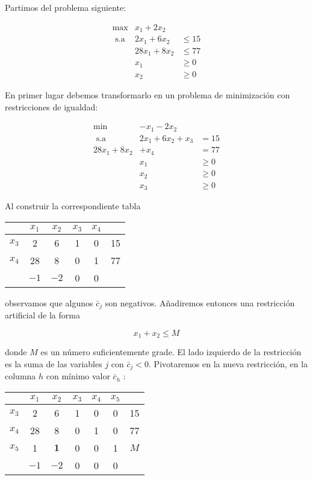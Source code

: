 \documentclass[openany]{book}
\begin{document}
\begin{example}

  Partimos del problema siguiente:

  $$
  \begin{array}{ccl}
  \max & x_{1}+2 x_{2} & \\
  \text { s.a } & 2 x_{1}+6 x_{2} & \leq 15 \\
  & 28 x_{1}+8 x_{2} & \leq 77 \\
  & x_{1} & \geq 0 \\
  &  x_{2} & \geq 0
  \end{array}
  $$

  En primer lugar debemos transformarlo en un problema de minimización con restricciones de igualdad:

  $$
  \begin{array}{lll}
  \min & -x_{1}-2 x_{2}  & \\
  \text { s.a } & 2 x_{1}+6 x_{2}+x_{3}  & =15 \\
   28 x_{1}+8 x_{2}  & +x_{4} & =77 \\
  & x_{1} &  \geq 0 \\
  & x_{2}   & \geq 0 \\
  &  x_{3}  & \geq 0
  \end{array}
  $$

  Al construir la correspondiente tabla

  \begin{tabular}{c|cccc|c}
  \hline & $x_{1}$ & $x_{2}$ & $x_{3}$ & $x_{4}$ & \\
  \hline$x_{3}$ & 2 & 6 & 1 & 0 & 15 \\
  $x_{4}$ & 28 & 8 & 0 & 1 & 77 \\
  \hline & $-1$ & $-2$ & 0 & 0 & \\
  \hline
  \end{tabular}

  observamos que algunos $\bar{c}_{j}$ son negativos. Añadiremos entonces una restricción artificial de la forma

  $$
  x_{1}+x_{2} \leq M
  $$

  donde $M$ es un número suficientemente grade. El lado izquierdo de la restricción es la suma de las variables $j$ con $\bar{c}_{j}<0 .$ Pivotaremos en la nueva restricción, en la columna $h$ con mínimo valor $\bar{c}_{h}$ :

  \begin{tabular}{c|ccccc|c}
  \hline & $x_{1}$ & $x_{2}$ & $x_{3}$ & $x_{4}$ & $x_{5}$ & \\
  \hline$x_{3}$ & 2 & 6 & 1 & 0 & 0 & 15 \\
  $x_{4}$ & 28 & 8 & 0 & 1 & 0 & 77 \\
  $x_{5}$ & 1 & $\mathbf{1}$ & 0 & 0 & 1 & $M$ \\
  \hline & $-1$ & $-2$ & 0 & 0 & 0 & \\
  \hline
  \end{tabular}


\end{example}
\end{document}
